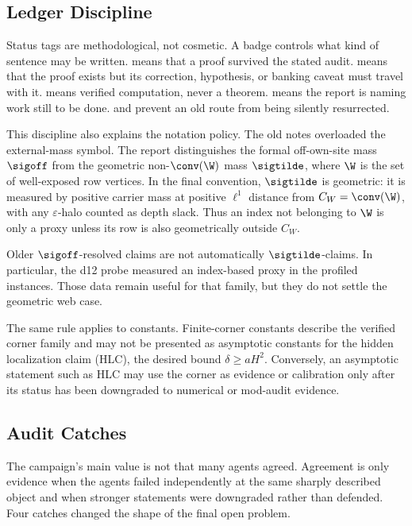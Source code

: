 \subsection{Ledger Discipline}

Status tags are methodological, not cosmetic.  A badge controls what kind of
sentence may be written.  \provedbadge{} means that a proof survived the stated
audit.  \modauditbadge{} means that the proof exists but its correction,
hypothesis, or banking caveat must travel with it.  \numbadge{} means verified
computation, never a theorem.  \openbadge{} means the report is naming work
still to be done.   and \downgradedbadge{} prevent an old route
from being silently resurrected.

This discipline also explains the notation policy.  The old notes overloaded
the external-mass symbol.  The report distinguishes the formal off-own-site
mass $\sigoff$ from the geometric non-$\conv(\W)$ mass $\sigtilde$, where
$\W$ is the set of well-exposed row vertices.  In the final convention,
$\sigtilde$ is geometric: it is measured by positive carrier mass at positive
$\ell^1$ distance from $C_W=\conv(\W)$, with any $\varepsilon$-halo counted as
depth slack.  Thus an index not belonging to $\W$ is only a proxy unless its
row is also geometrically outside $C_W$.

\begin{warning}
\downgradedbadge{} Older $\sigoff$-resolved claims are not automatically
$\sigtilde$-claims.  In particular, the d12 probe measured an index-based
proxy in the profiled instances.  Those data remain useful for that family,
but they do not settle the geometric web case.
\end{warning}

The same rule applies to constants.  Finite-corner constants describe the
verified corner family and may not be presented as asymptotic constants for
the hidden localization claim (HLC), the desired bound $\delta\ge aH^2$.
Conversely, an asymptotic statement such as HLC may use the corner as evidence
or calibration only after its status has been downgraded to numerical or
mod-audit evidence.

\subsection{Audit Catches}

The campaign's main value is not that many agents agreed.  Agreement is only
evidence when the agents failed independently at the same sharply described
object and when stronger statements were downgraded rather than defended.
Four catches changed the shape of the final open problem.

